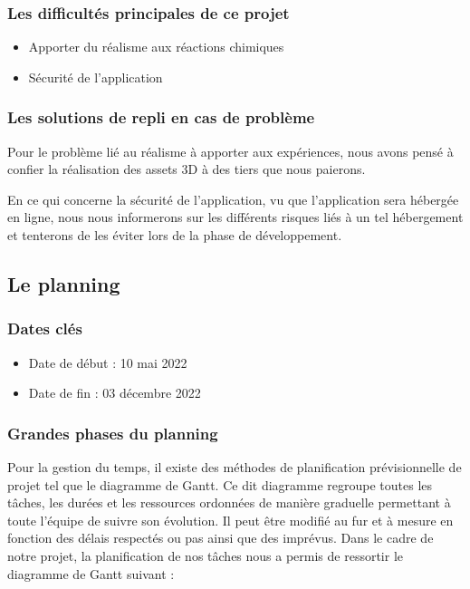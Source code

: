 \subsubsection{Les difficultés principales de ce projet}

\begin{itemize}
	\item Apporter du réalisme aux réactions chimiques
	\item Sécurité de l’application
\end{itemize}

\subsubsection{Les solutions de repli en cas de problème }

Pour le problème lié au réalisme à apporter aux expériences, nous avons pensé à confier la réalisation des assets 3D à des tiers que nous paierons.

En ce qui concerne la sécurité de l’application, vu que l’application sera hébergée en ligne, nous nous informerons sur les différents risques liés à un tel hébergement et tenterons de les éviter lors de la phase de développement.

\subsection{Le planning}

\subsubsection{Dates clés}

\begin{itemize}
	\item Date de début : 10 mai 2022
	\item Date de fin :  03 décembre 2022
\end{itemize}

\subsubsection{Grandes phases du planning}

Pour la gestion du temps, il existe des méthodes de planification prévisionnelle de projet tel que le diagramme de Gantt. Ce dit diagramme regroupe toutes les tâches, les durées et les ressources ordonnées de manière graduelle permettant à toute l’équipe de suivre son évolution. Il peut être modifié au fur et à mesure en fonction des délais respectés ou pas ainsi que des imprévus. Dans le cadre de notre projet, la planification de nos tâches nous a permis de ressortir le diagramme de Gantt suivant :


